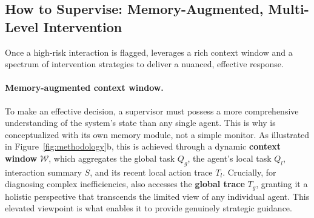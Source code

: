 \subsection{How to Supervise: Memory-Augmented, Multi-Level Intervention}
\label{sec:methodology_action}
Once a high-risk interaction is flagged, \method leverages a rich context window and a spectrum of intervention strategies to deliver a nuanced, effective response.

\paragraph{Memory-augmented context window.} To make an effective decision, a supervisor must possess a more comprehensive understanding of the system's state than any single agent.
This is why \method is conceptualized with its own memory module, not a simple monitor.
As illustrated in Figure~\ref{fig:methodology}b, this is achieved through a dynamic \textbf{context window} $\mathcal{W}$, which aggregates the global task $Q_g$, the agent's local task $Q_l$, interaction summary $S$, and its recent local action trace $T_l$.
Crucially, for diagnosing complex inefficiencies, \method also accesses the \textbf{global trace} $T_g$, granting it a holistic perspective that transcends the limited view of any individual agent.
This elevated viewpoint is what enables it to provide genuinely strategic guidance.

